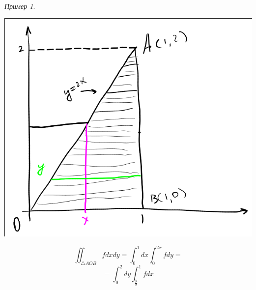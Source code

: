 \documentclass[english]{article}
\theoremstyle{plain}
\theoremstyle{remark}
\newtheorem*{examp}{Пример}
\theoremstyle{definition}
\begin{document}
\begin{examp}
\-
\begin{center}
\includegraphics[scale=0.35]{2_3.png}
\end{center}
\[ \iint_{\bigtriangleup AOB} f dx dy = \int_0^1 dx \int_0^{2x} f dy =  \]
\[ = \int_0^2 dy \int_{\frac{y}{2}}^1 f dx \]
\end{examp}
\end{document}
